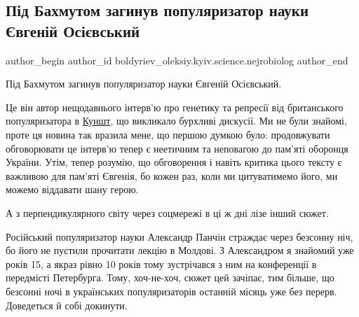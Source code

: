  
 
 
 
 

\subsection{Під Бахмутом загинув популяризатор науки Євгеній Осієвський}
\label{sec:29_05_2023.fb.boldyriev_oleksiy.kyiv.science.nejrobiolog.1.pid_bahmutom_zagynuv_evgenij_osievskij_populjaryzator_nauky}

\ifcmt
 author_begin
   author_id boldyriev_oleksiy.kyiv.science.nejrobiolog
 author_end
\fi

Під Бахмутом загинув популяризатор науки Євгеній Осієвський.

Це він автор нещодавнього інтерв'ю про генетику та репресії від британського
популяризатора в \href{https://www.facebook.com/kunsht}{Куншт}, що викликало
бурхливі дискусії. Ми не були знайомі, проте ця новина так вразила мене, що
першою думкою було: продовжувати обговорювати це інтерв'ю тепер є неетичним та
неповагою до пам'яті оборонця України. Утім, тепер розумію, що обговорення і
навіть критика цього тексту є важливою для пам'яті Євгенія, бо кожен раз, коли
ми цитуватимемо його, ми можемо віддавати шану герою.


А з перпендикулярного світу через соцмережі в ці ж дні лізе інший сюжет.

Російський популяризатор науки Александр Панчін страждає через безсонну ніч, бо
його не пустили прочитати лекцію в Молдові. З Александром я знайомий уже років
15, а якраз рівно 10 років тому зустрічався з ним на конференції в передмісті
Петербурга. Тому, хоч-не-хоч, сюжет цей зачіпає, тим більше, що безсонні ночі в
українських популяризаторів останній місяць уже без перерв. Доведеться й собі
докинути.

